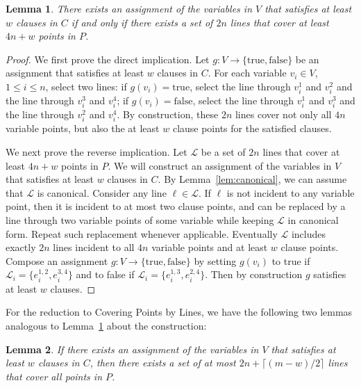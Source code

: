\documentclass[letterpaper,11pt]{article}
\newtheorem{lemma}{Lemma}
\def\L{{\mathcal L}}
\begin{document}
\begin{lemma}\label{lem:max-iff}
There exists an assignment of the variables in $V$
that satisfies at least $w$ clauses in $C$
if and only if
there exists a set of $2n$ lines
that cover at least $4n+w$ points in $P$.
\end{lemma}

\begin{proof}
We first prove the direct implication.
Let $g:V \to \{\textrm{true}, \textrm{false}\}$
be an assignment that satisfies at least $w$ clauses in $C$.
For each variable $v_i \in V$, $1 \le i \le n$,
select two lines:
if $g(v_i) = \textrm{true}$,
select the line through $v_i^1$ and $v_i^2$
and the line through $v_i^3$ and $v_i^4$;
if $g(v_i) = \textrm{false}$,
select the line through $v_i^1$ and $v_i^3$
and the line through $v_i^2$ and $v_i^4$.
By construction,
these $2n$ lines cover not only all $4n$ variable points,
but also the at least $w$ clause points for the satisfied clauses.

We next prove the reverse implication.
Let $\L$ be a set of $2n$ lines that cover at least $4n+w$ points in $P$.
We will construct an assignment of the variables in $V$
that satisfies at least $w$ clauses in $C$.
By Lemma~\ref{lem:canonical}, we can assume that $\L$ is canonical.
Consider any line $\ell \in \L$.
If $\ell$ is not incident to any variable point,
then it is incident to at most two clause points,
and can be replaced by a line through two variable points of some variable
while keeping $\L$ in canonical form.
Repeat such replacement whenever applicable.
Eventually $\L$ includes exactly $2n$ lines
incident to all $4n$ variable points
and at least $w$ clause points.
Compose an assignment
$g:V \to \{\textrm{true}, \textrm{false}\}$
by setting $g(v_i)$ to true if $\L_i = \{e_i^{1,2},e_i^{3,4}\}$
and to false if $\L_i = \{e_i^{1,3},e_i^{2,4}\}$.
Then by construction $g$ satisfies at least $w$ clauses.
\end{proof}

For the reduction to {\sc Covering Points by Lines},
we have the following two lemmas analogous to Lemma~\ref{lem:max-iff}
about the construction:

\begin{lemma}\label{lem:min-direct}
If there exists an assignment of the variables in $V$
that satisfies at least $w$ clauses in $C$,
then there exists a set of at most $2n + \lceil (m - w) / 2 \rceil$ lines
that cover all points in $P$.
\end{lemma}
\end{document}
